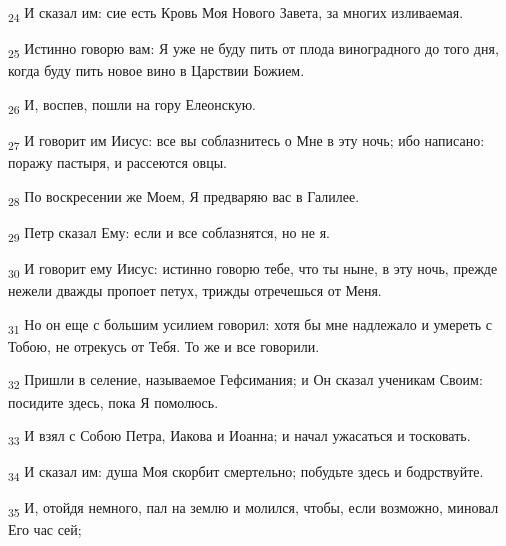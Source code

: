 \begin{tcolorbox}
\textsubscript{24} И сказал им: сие есть Кровь Моя Нового Завета, за многих изливаемая.
\end{tcolorbox}
\begin{tcolorbox}
\textsubscript{25} Истинно говорю вам: Я уже не буду пить от плода виноградного до того дня, когда буду пить новое вино в Царствии Божием.
\end{tcolorbox}
\begin{tcolorbox}
\textsubscript{26} И, воспев, пошли на гору Елеонскую.
\end{tcolorbox}
\begin{tcolorbox}
\textsubscript{27} И говорит им Иисус: все вы соблазнитесь о Мне в эту ночь; ибо написано: поражу пастыря, и рассеются овцы.
\end{tcolorbox}
\begin{tcolorbox}
\textsubscript{28} По воскресении же Моем, Я предваряю вас в Галилее.
\end{tcolorbox}
\begin{tcolorbox}
\textsubscript{29} Петр сказал Ему: если и все соблазнятся, но не я.
\end{tcolorbox}
\begin{tcolorbox}
\textsubscript{30} И говорит ему Иисус: истинно говорю тебе, что ты ныне, в эту ночь, прежде нежели дважды пропоет петух, трижды отречешься от Меня.
\end{tcolorbox}
\begin{tcolorbox}
\textsubscript{31} Но он еще с большим усилием говорил: хотя бы мне надлежало и умереть с Тобою, не отрекусь от Тебя. То же и все говорили.
\end{tcolorbox}
\begin{tcolorbox}
\textsubscript{32} Пришли в селение, называемое Гефсимания; и Он сказал ученикам Своим: посидите здесь, пока Я помолюсь.
\end{tcolorbox}
\begin{tcolorbox}
\textsubscript{33} И взял с Собою Петра, Иакова и Иоанна; и начал ужасаться и тосковать.
\end{tcolorbox}
\begin{tcolorbox}
\textsubscript{34} И сказал им: душа Моя скорбит смертельно; побудьте здесь и бодрствуйте.
\end{tcolorbox}
\begin{tcolorbox}
\textsubscript{35} И, отойдя немного, пал на землю и молился, чтобы, если возможно, миновал Его час сей;
\end{tcolorbox}

